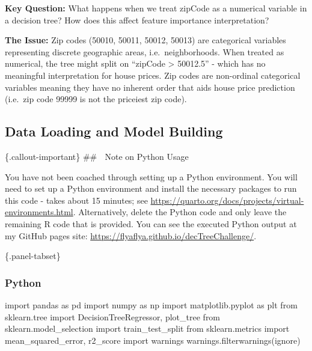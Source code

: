 \documentclass[
  letterpaper,
  DIV=11,
  numbers=noendperiod]{scrartcl}
\newenvironment{Shaded}{\begin{snugshade}}{\end{snugshade}}
\newcommand{\ImportTok}[1]{\textcolor[rgb]{0.00,0.46,0.62}{#1}}
\newcommand{\NormalTok}[1]{\textcolor[rgb]{0.00,0.23,0.31}{#1}}
\newcommand{\StringTok}[1]{\textcolor[rgb]{0.13,0.47,0.30}{#1}}
\begin{document}
\begin{tcolorbox}
\textbf{Key Question:} What happens when we treat zipCode as a numerical
variable in a decision tree? How does this affect feature importance
interpretation?

\textbf{The Issue:} Zip codes (50010, 50011, 50012, 50013) are
categorical variables representing discrete geographic areas,
i.e.~neighborhoods. When treated as numerical, the tree might split on
``zipCode \textgreater{} 50012.5'' - which has no meaningful
interpretation for house prices. Zip codes are non-ordinal categorical
variables meaning they have no inherent order that aids house price
prediction (i.e.~zip code 99999 is not the priceiest zip code).

\subsection{Data Loading and Model
Building}\label{data-loading-and-model-building}

\{.callout-important\} \#\# 🎯 Note on Python Usage

You have not been coached through setting up a Python environment. You
will need to set up a Python environment and install the necessary
packages to run this code - takes about 15 minutes; see
\url{https://quarto.org/docs/projects/virtual-environments.html}.
Alternatively, delete the Python code and only leave the remaining R
code that is provided. You can see the executed Python output at my
GitHub pages site: \url{https://flyaflya.github.io/decTreeChallenge/}.

\{.panel-tabset\}

\subsubsection{Python}\label{python}

\label{load-and-model-python}
\begin{Shaded}
\begin{Highlighting}[]
\ImportTok{import}\NormalTok{ pandas }\ImportTok{as}\NormalTok{ pd}
\ImportTok{import}\NormalTok{ numpy }\ImportTok{as}\NormalTok{ np}
\ImportTok{import}\NormalTok{ matplotlib.pyplot }\ImportTok{as}\NormalTok{ plt}
\ImportTok{from}\NormalTok{ sklearn.tree }\ImportTok{import}\NormalTok{ DecisionTreeRegressor, plot\_tree}
\ImportTok{from}\NormalTok{ sklearn.model\_selection }\ImportTok{import}\NormalTok{ train\_test\_split}
\ImportTok{from}\NormalTok{ sklearn.metrics }\ImportTok{import}\NormalTok{ mean\_squared\_error, r2\_score}
\ImportTok{import}\NormalTok{ warnings}
\NormalTok{warnings.filterwarnings(}\StringTok{\textquotesingle{}ignore\textquotesingle{}}\NormalTok{)}


\end{Highlighting}
\end{Shaded}
\end{tcolorbox}
\end{document}
